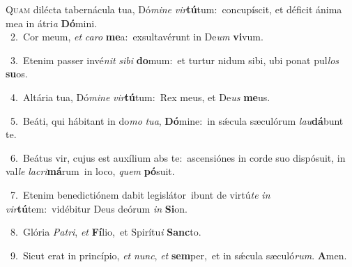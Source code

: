\lettrine{\initial\textcolor{\initialcolor}{Q}}{uam} dilécta tabernácula tua, Dó\-\textit{mi}\-\textit{ne} \textit{vir}\-\textbf{tú}tum:~\star concupíscit, et déficit ánima mea in átri\textit{a} \textbf{Dó}\-mini.\\
{\numbfont\textcolor{\numbcolor}{~2.}}~Cor meum, \textit{et} \textit{ca}\-\textit{ro} \textbf{me}\-a:~\star exsultavérunt in De\textit{um} \textbf{vi}\-vum.\par
{\numbfont\textcolor{\numbcolor}{~3.}}~Etenim passer invé\textit{nit} \textit{si}\-\textit{bi} \textbf{do}\-mum:~\star et turtur nidum sibi, ubi ponat pul\textit{los} \textbf{su}\-os.\par
{\numbfont\textcolor{\numbcolor}{~4.}}~Altária tua, Dó\-\textit{mi}\-\textit{ne} \textit{vir}\-\textbf{tú}tum:~\star Rex meus, et De\textit{us} \textbf{me}\-us.\par
{\numbfont\textcolor{\numbcolor}{~5.}}~Beáti, qui hábitant in do\textit{mo} \textit{tu}\-\textit{a}, \textbf{Dó}\-mine:~\star in sǽcula sæculórum \textit{lau}\-\textbf{dá}bunt te.\par
{\numbfont\textcolor{\numbcolor}{~6.}}~Beátus vir, cujus est auxílium abs te:~\dagger ascensiónes in corde suo dispósuit, in val\textit{le} \textit{la}\-\textit{cri}\textbf{má}rum~\star in loco, \textit{quem} \textbf{pó}\-suit.\par
{\numbfont\textcolor{\numbcolor}{~7.}}~Etenim benedictiónem dabit legislátor~\dagger ibunt de virtú\textit{te} \textit{in} \textit{vir}\-\textbf{tú}tem:~\star vidébitur Deus deórum \textit{in} \textbf{Si}\-on.\par
{\numbfont\textcolor{\numbcolor}{~8.}}~Glória \textit{Pa}\-\textit{tri}, \textit{et} \textbf{Fí}\-lio,~\star et Spirítu\textit{i} \textbf{Sanc}\-to.\par
{\numbfont\textcolor{\numbcolor}{~9.}}~Sicut erat in princípio, \textit{et} \textit{nunc}\-, \textit{et} \textbf{sem}\-per,~\star et in sǽcula sæculó\-\textit{rum}\-. \textbf{A}\-men.\par
